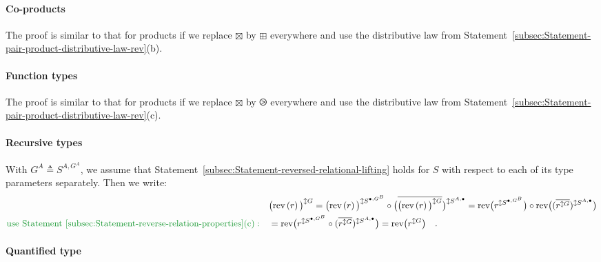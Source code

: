 \paragraph{Co-products}

The proof is similar to that for products if we replace $\boxtimes$
by $\boxplus$ everywhere and use the distributive law from Statement~\ref{subsec:Statement-pair-product-distributive-law-rev}(b).

\paragraph{Function types}

The proof is similar to that for products if we replace $\boxtimes$
by $\ogreaterthan$ everywhere and use the distributive law from Statement~\ref{subsec:Statement-pair-product-distributive-law-rev}(c).

\paragraph{Recursive types}

With $G^{A}\triangleq S^{A,G^{A}}$, we assume that Statement~\ref{subsec:Statement-reversed-relational-lifting}
holds for $S$ with respect to each of its type parameters separately.
Then we write: 
\begin{align*}
 & \big(\text{rev}\left(r\right)\big)^{\updownarrow G}=\big(\text{rev}\left(r\right)\big)^{\updownarrow S^{\bullet,G^{B}}}\circ\big(\overline{\big(\text{rev}\left(r\right)\big)^{\updownarrow G}}\big)^{\updownarrow S^{A,\bullet}}=\text{rev}\big(r^{\updownarrow S^{\bullet,G^{B}}}\big)\circ\text{rev}\big((\overline{r^{\updownarrow G}})^{\updownarrow S^{A,\bullet}}\big)\\
{\color{greenunder}\text{use Statement~\ref{subsec:Statement-reverse-relation-properties}(c)}:}\quad & =\text{rev}\big(r^{\updownarrow S^{\bullet,G^{B}}}\circ(\overline{r^{\updownarrow G}})^{\updownarrow S^{A,\bullet}}\big)=\text{rev}\big(r^{\updownarrow G}\big)\quad.
\end{align*}


\paragraph{Quantified type}

